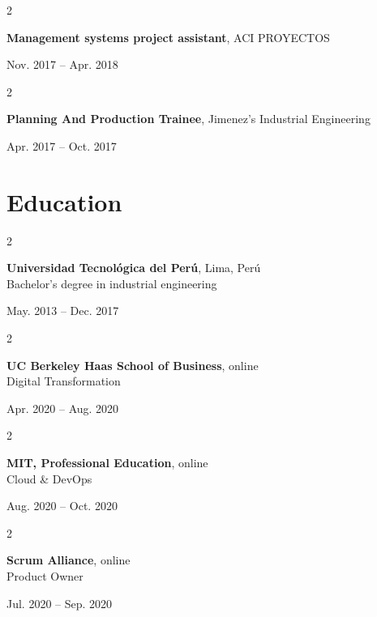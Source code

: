 \documentclass[10pt, letterpaper]{article}
\newenvironment{twocolentry}[2][]{
    \onecolentry
    \def\secondColumn{#2}
    \setcolumnwidth{\fill, 4.5 cm}
    \begin{paracol}{2}
}{
    \switchcolumn \raggedleft \secondColumn
    \end{paracol}
    \endonecolentry
} %
\begin{document}
        \begin{twocolentry}{
            Nov. 2017 -- Apr. 2018
        }
            \textbf{Management systems project assistant}, ACI PROYECTOS
        \end{twocolentry}
        \vspace{0.2 cm}
        
        \begin{twocolentry}{
            Apr. 2017 -- Oct. 2017
        }
            \textbf{Planning And Production Trainee}, Jimenez's Industrial Engineering
        \end{twocolentry}
        \vspace{0.2 cm}
        
    \section{Education}
            
            \begin{twocolentry}{
                May. 2013 -- Dec. 2017
            }
                \textbf{Universidad Tecnol\'ogica del Per\'u}, Lima, Per\'u\\
                Bachelor's degree in industrial engineering
            \end{twocolentry}
            \vspace{0.2 cm}
            
            \begin{twocolentry}{
                Apr. 2020 -- Aug. 2020
            }
                \textbf{UC Berkeley Haas School of Business}, online\\
                Digital Transformation
            \end{twocolentry}
            \vspace{0.2 cm}
            
            \begin{twocolentry}{
                Aug. 2020 -- Oct. 2020
            }
                \textbf{MIT, Professional Education}, online\\
                Cloud \& DevOps
            \end{twocolentry}
            \vspace{0.2 cm}
            
            \begin{twocolentry}{
                Jul. 2020 -- Sep. 2020
            }
                \textbf{Scrum Alliance}, online\\
                Product Owner
    \end{twocolentry}
\end{document}

